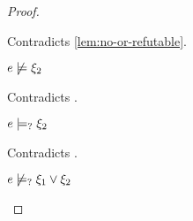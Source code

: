 \begin{proof}
\begin{byCases}
\begin{byCases}
\begin{byCases}
\begin{pfsteps*}
            \end{pfsteps*}
            Contradicts \autoref{lem:no-or-refutable}.
        \item[\text{(\ref{rule:CMSOr1})}]
            \begin{pfsteps*}
            \item $e \not\models \xi_2$ 
            \end{pfsteps*}
            Contradicts .
        \item[\text{(\ref{rule:CMSOr2})}]
            \begin{pfsteps*}
            \item $e \models_{?} \xi_2$ 
            \end{pfsteps*}
            Contradicts .
        \end{byCases}
        \begin{pfsteps*}
        \item $e \not\models_{?} \xi_1 \vee \xi_2$ 
        \end{pfsteps*}
        

\end{byCases}
\end{byCases}
\end{proof}
